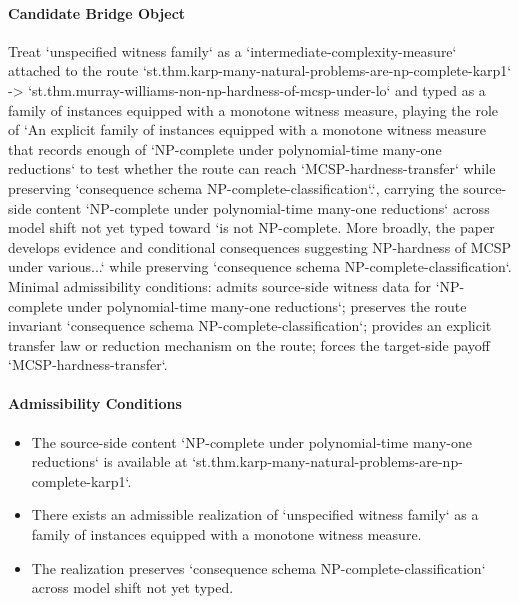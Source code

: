 \documentclass[11pt]{article}
\begin{document}
\paragraph{Candidate Bridge Object}
Treat `unspecified witness family` as a `intermediate-complexity-measure` attached to the route `st.thm.karp-many-natural-problems-are-np-complete-karp1` -> `st.thm.murray-williams-non-np-hardness-of-mcsp-under-lo` and typed as a family of instances equipped with a monotone witness measure, playing the role of `An explicit family of instances equipped with a monotone witness measure that records enough of `NP-complete under polynomial-time many-one reductions` to test whether the route can reach `MCSP-hardness-transfer` while preserving `consequence schema NP-complete-classification`.`, carrying the source-side content `NP-complete under polynomial-time many-one reductions` across model shift not yet typed toward `is not NP-complete. More broadly, the paper develops evidence and conditional consequences suggesting NP-hardness of MCSP under various...` while preserving `consequence schema NP-complete-classification`. Minimal admissibility conditions: admits source-side witness data for `NP-complete under polynomial-time many-one reductions`; preserves the route invariant `consequence schema NP-complete-classification`; provides an explicit transfer law or reduction mechanism on the route; forces the target-side payoff `MCSP-hardness-transfer`.
\paragraph{Admissibility Conditions}
\begin{itemize}
\item The source-side content `NP-complete under polynomial-time many-one reductions` is available at `st.thm.karp-many-natural-problems-are-np-complete-karp1`.
\item There exists an admissible realization of `unspecified witness family` as a family of instances equipped with a monotone witness measure.
\item The realization preserves `consequence schema NP-complete-classification` across model shift not yet typed.
\end{itemize}
\end{document}
